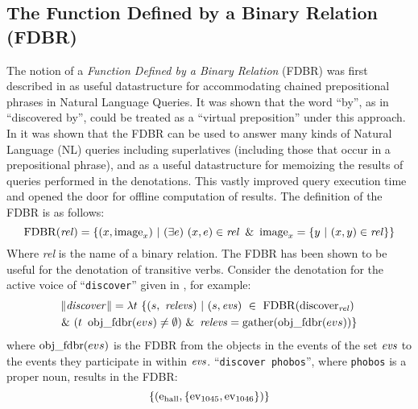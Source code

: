 \documentclass[../main.tex]{subfiles}
\begin{document}
\begin{refsection}
%
%

\subsection{The Function Defined by a Binary Relation (FDBR)}
\label{webist2020conf:fdbr}

The notion of a \textit{Function Defined by a Binary Relation} (FDBR) was first described in \cite{peelar2016accommodating} as useful datastructure for accommodating chained prepositional phrases in Natural Language Queries.  It was shown that the word ``by'', as in ``discovered by'', could be treated as a ``virtual preposition'' under this approach. In \cite{frostpeelar2019} it was shown that the FDBR can be used to answer many kinds of Natural Language (NL) queries including superlatives (including those that occur in a prepositional phrase), and as a useful datastructure for memoizing the results of queries performed in the denotations.  This vastly improved query execution time and opened the door for offline computation of results.
The definition of the FDBR is as follows:
\begin{equation*}
		\FDBR{\rel} = \{(x, \image_x)\ | \ (\exists e)\ (x, e) \in \rel\ \& \ \image_x = \{ y\ |\ (x, y) \in \rel \}  \}
\end{equation*}
Where \textit{rel} is the name of a binary relation.
The FDBR has been shown to be useful for the denotation of transitive verbs.  Consider the denotation for the active voice of ``\texttt{discover}'' given in \cite{peelar2020compositional}, for example:
\begin{multline*}
	\meaningof{discover} =
	\lambda t\ \{ (s,\ \opit{relevs})\ |\ (s, \evs)\ \in\ \FDBR{\relation{discover}}\ \\
	\&\ (t\ \objfdbr{evs} \neq \emptyset)\ \&\ \opit{relevs} = \gatherevs{\objfdbr{evs}} \}
\end{multline*}
where $\operatorname{obj\_fdbr}({evs})$ is the FDBR from the objects in the events of the set $\operatorname{\mathit{evs}}$ to the events they participate in within $\operatorname{\mathit{evs}}$.  ``\texttt{discover phobos}'', where \texttt{phobos} is a proper noun, results in the FDBR:
\begin{equation*}
	\{(\mathrm{e}_{\operatorname{\operatorname{hall}}}, \{ \operatorname{ev}_{1045}, \operatorname{ev}_{1046} \})\}
\end{equation*}

\end{refsection}
\end{document}
